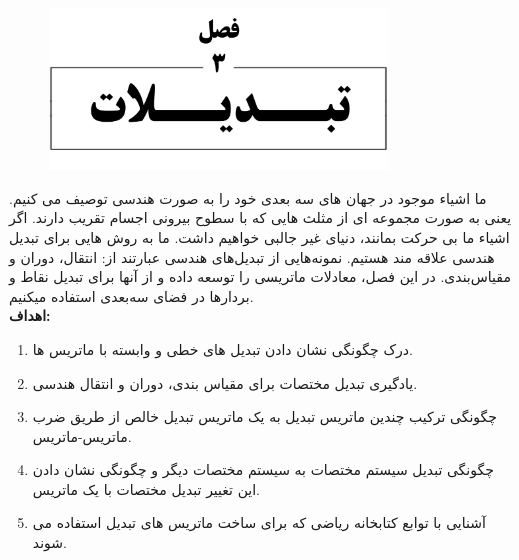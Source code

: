 \newpage

\setcounter{chapter}{3}
\setcounter{example}{0}
\setcounter{eqtn}{0}
\setcounter{section}{0}


\chapter{}
\textbf{\vspace{-150pt}}
\begin{figure}[H]
    \centering
    \setlength{\belowcaptionskip}{-10pt}
    \includegraphics[width=0.8\textwidth]{Images/4/3/4.Session.1.3.0}
    \label{fig:4.Session.1.3.0}
\end{figure}
\textbf{\vspace{10pt}}
{
    \Large
    \begin{spacing}{1.5}
        ما اشیاء موجود در جهان های سه بعدی خود را به صورت هندسی توصیف می کنیم.
        یعنی به صورت مجموعه ای از مثلث هایی که با سطوح بیرونی اجسام تقریب دارند.
        اگر اشیاء ما بی حرکت بمانند، دنیای غیر جالبی خواهیم داشت.
        ما به روش هایی برای تبدیل هندسی علاقه مند هستیم.
        نمونه‌هایی از تبدیل‌های هندسی عبارتند از: انتقال، دوران و مقیاس‌بندی.
        در این فصل، معادلات ماتریسی را توسعه داده و از آنها برای تبدیل نقاط و بردارها در فضای سه‌بعدی استفاده میکنیم.
        \\

        \textbf{\LARGE \hspace{-40pt}اهداف:}
        \begin{enumerate}[label=\textbf{\arabic*}.]
            \item {درک چگونگی نشان دادن تبدیل های خطی و وابسته با ماتریس ها.}
            \item {یادگیری تبدیل مختصات برای مقیاس بندی، دوران و انتقال هندسی.}
            \item {چگونگی ترکیب چندین ماتریس تبدیل به یک ماتریس تبدیل خالص از طریق ضرب ماتریس-ماتریس.}
            \item {چگونگی تبدیل سیستم مختصات به سیستم مختصات دیگر و چگونگی نشان دادن این تغییر تبدیل مختصات با یک ماتریس.}
            \item {آشنایی با توابع کتابخانه ریاضی  که برای ساخت ماتریس های تبدیل استفاده می شوند.}
        \end{enumerate}
    \end{spacing}
}
\newpage

